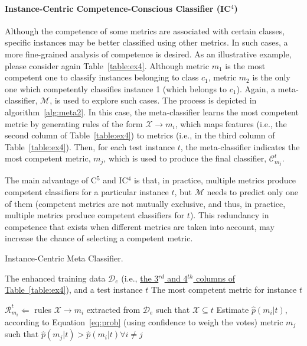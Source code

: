 \paragraph*{Instance-Centric Competence-Conscious Classifier (IC$^4$)} Although the competence of some metrics are associated with certain classes, specific instances may be better classified using other metrics. In such cases, a more fine-grained analysis of competence is desired. As an illustrative example, please consider again Table~\ref{table:ex4}. Although metric $m_1$ is the most competent one to classify instances belonging to class $c_1$, metric $m_2$ is the only one which competently classifies instance 1 (which belongs to $c_1$). Again, a meta-classifier, $\mathcal{M}$, is used to explore such cases. The process is depicted in algorithm~\ref{alg:meta2}. In this case, the meta-classifier learns the most competent metric by generating rules of the form $\mathcal{X}\xrightarrow{}m_i$, which maps features (i.e., the second column of Table~\ref{table:ex4}) to metrics (i.e., in the third column of Table~\ref{table:ex4}). Then, for each test instance $t$, the meta-classifier indicates the most competent metric, $m_j$, which is used to produce the final classifier, $\mathcal{C}^t_{m_j}$.

The main advantage of C$^5$ and IC$^4$ is that, in practice, multiple metrics produce competent classifiers for a particular instance $t$, but $\mathcal{M}$ needs to predict only one of them
(competent metrics are not mutually exclusive, and thus, in practice, multiple metrics produce competent classifiers for $t$).
This redundancy in competence that exists when different metrics are taken into account, may increase the chance of selecting a competent metric.

\begin{algorithm} [htp]
\caption{Instance-Centric Meta Classifier.}
\begin{algorithmic}[1]
\REQUIRE The enhanced training data $\mathcal{D}_e$ (i.e., \underline{the 3$^{rd}$ and 4$^{th}$ columns of Table~\ref{table:ex4}}), and a test instance $t$
\ENSURE The most competent metric for instance $t$

\medskip

\STATE $\mathcal{R}^{t}_{m_i}\Leftarrow$ rules $\mathcal{X}\xrightarrow{}m_i$ extracted from $\mathcal{D}_e$ such that $\mathcal{X}\subseteq t$
\STATE Estimate $\hat{p}(m_i|t)$, according to Equation~\ref{eq:prob} (using confidence to weigh the votes)
\ENDFOR
{} metric $m_j$ such that $\hat{p}(m_j|t)>\hat{p}(m_i|t)\forall i\ne j$

\end{algorithmic}
\label{alg:meta2}
\end{algorithm}

